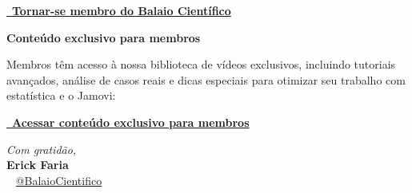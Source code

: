 \begin{center}
\begin{tcolorbox}[
  colback=red!5!white,
  colframe=red!60!black,
  arc=3mm,
  width=10cm,
  halign=center,
  valign=center,
  boxrule=1pt,
  sharp corners=all,
  rounded corners=northwest,
  rounded corners=northeast,
  rounded corners=southwest,
  rounded corners=southeast
]
\href{https://www.youtube.com/channel/UCzHAqwm3RSDM-YKdxd4XYTg/join}{\textcolor{red}{\faYoutube}\ \textbf{Tornar-se membro do Balaio Científico}}
\end{tcolorbox}
\end{center}

\vspace{2mm}
\begin{center}
\textbf{Conteúdo exclusivo para membros}
\end{center}

Membros têm acesso à nossa biblioteca de vídeos exclusivos, incluindo tutoriais avançados, análise de casos reais e dicas especiais para otimizar seu trabalho com estatística e o Jamovi:

\vspace{2mm}
\begin{center}
\begin{tcolorbox}[
  colback=blue!5!white,
  colframe=blue!60!black,
  arc=3mm,
  width=10cm,
  halign=center,
  valign=center,
  boxrule=1pt,
  sharp corners=all,
  rounded corners=northwest,
  rounded corners=northeast,
  rounded corners=southwest,
  rounded corners=southeast
]
\href{https://www.youtube.com/playlist?list=UUMOzHAqwm3RSDM-YKdxd4XYTg}{\textcolor{blue}{\faPlayCircle}\ \textbf{Acessar conteúdo exclusivo para membros}}
\end{tcolorbox}
\end{center}

\vspace{3mm}
\begin{flushright}
\textit{Com gratidão,}\\
\textbf{Erick Faria}\\
\textcolor{red}{\small\faYoutube}\ \small{ \href{https://www.youtube.com/@BalaioCient%C3%ADfico}{@BalaioCientifico}}
\end{flushright}

\newpage


